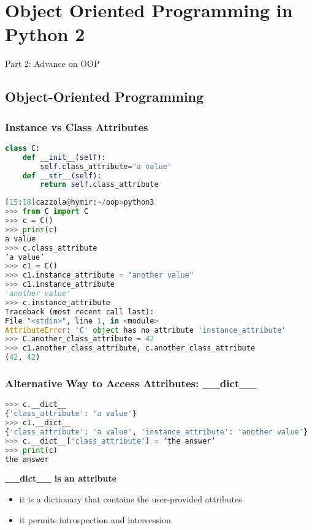 \section{Object Oriented Programming in Python 2}

Part 2: Advance on OOP

\subsection{Object-Oriented Programming}

\subsubsection{Instance vs Class Attributes}

\begin{lstlisting}[language=Python]
class C:
	def __init__(self):
		self.class_attribute="a value"
	def __str__(self):
		return self.class_attribute
\end{lstlisting}

\begin{lstlisting}[language=Python]
[15:18]cazzola@hymir:~/oop>python3
>>> from C import C
>>> c = C()
>>> print(c)
a value
>>> c.class_attribute
’a value’
>>> c1 = C()
>>> c1.instance_attribute = "another value"
>>> c1.instance_attribute
'another value'
>>> c.instance_attribute
Traceback (most recent call last):
File "<stdin>", line 1, in <module>
AttributeError: 'C' object has no attribute 'instance_attribute'
>>> C.another_class_attribute = 42
>>> c1.another_class_attribute, c.another_class_attribute
(42, 42)
\end{lstlisting}

\subsubsection{Alternative Way to Access Attributes: __dict__}

\begin{lstlisting}[language=Python]
>>> c.__dict__
{'class_attribute': 'a value'}
>>> c1.__dict__
{'class_attribute': 'a value', 'instance_attribute': 'another value'}
>>> c.__dict__['class_attribute'] = ’the answer’
>>> print(c)
the answer
\end{lstlisting}

\textbf{__dict__ is an attribute}
\begin{itemize}
	\item it is a dictionary that contains the user-provided attributes
	\item it permits introspection and intercession
\end{itemize}

